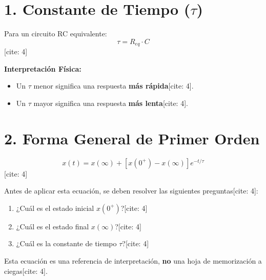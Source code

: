 \documentclass[11pt, a4paper]{article}
\begin{document}
\begin{tcolorbox}[colback=ucbblue!5!white, colframe=ucbblue, title=\textbf{Artefacto 4: Referencia Exponencial (Condicional)}]
\end{tcolorbox}

\section*{1. Constante de Tiempo ($\tau$)}
Para un circuito RC equivalente:
$$ \tau = R_{eq} \cdot C $$[cite: 4]

\textbf{Interpretación Física:}
\begin{itemize}
    \item Un $\tau$ menor significa una respuesta \textbf{más rápida}[cite: 4].
    \item Un $\tau$ mayor significa una respuesta \textbf{más lenta}[cite: 4].
\end{itemize}

\section*{2. Forma General de Primer Orden}
$$ x(t) = x(\infty) + \left[ x(0^+) - x(\infty) \right] e^{-t/\tau} $$[cite: 4]

Antes de aplicar esta ecuación, se deben resolver las siguientes preguntas[cite: 4]:
\begin{enumerate}
    \item ¿Cuál es el estado inicial $x(0^+)$?[cite: 4]
    \item ¿Cuál es el estado final $x(\infty)$?[cite: 4]
    \item ¿Cuál es la constante de tiempo $\tau$?[cite: 4]
\end{enumerate}

\vspace{1cm}
\begin{tcolorbox}[colback=red!5!white, colframe=red!75!black, title=\textbf{ADVERTENCIA DE INGENIERÍA}]
    \centering
    Esta ecuación es una referencia de interpretación, \textbf{no} una hoja de memorización a ciegas[cite: 4].
\end{tcolorbox}
\end{document}
